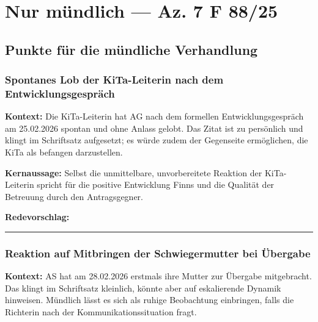 \documentclass[
  11pt,
  a4paper,
]{article}
\begin{document}

\section{Nur mündlich --- Az. 7 F
88/25}\label{nur-muxfcndlich-az.-7-f-8825}

\subsection{Punkte für die mündliche
Verhandlung}\label{punkte-fuxfcr-die-muxfcndliche-verhandlung}

\subsubsection{Spontanes Lob der KiTa-Leiterin nach dem
Entwicklungsgespräch}\label{spontanes-lob-der-kita-leiterin-nach-dem-entwicklungsgespruxe4ch}

\textbf{Kontext:} Die KiTa-Leiterin hat AG nach dem formellen
Entwicklungsgespräch am 25.02.2026 spontan und ohne Anlass gelobt. Das
Zitat ist zu persönlich und klingt im Schriftsatz aufgesetzt; es würde
zudem der Gegenseite ermöglichen, die KiTa als befangen darzustellen.

\textbf{Kernaussage:} Selbst die unmittelbare, unvorbereitete Reaktion
der KiTa-Leiterin spricht für die positive Entwicklung Finns und die
Qualität der Betreuung durch den Antragsgegner.

\textbf{Redevorschlag:}

\begin{center}\rule{0.5\linewidth}{0.5pt}\end{center}

\subsubsection{Reaktion auf Mitbringen der Schwiegermutter bei
Übergabe}\label{reaktion-auf-mitbringen-der-schwiegermutter-bei-uxfcbergabe}

\textbf{Kontext:} AS hat am 28.02.2026 erstmals ihre Mutter zur Übergabe
mitgebracht. Das klingt im Schriftsatz kleinlich, könnte aber auf
eskalierende Dynamik hinweisen. Mündlich lässt es sich als ruhige
Beobachtung einbringen, falls die Richterin nach der
Kommunikationssituation fragt.
\end{document}
